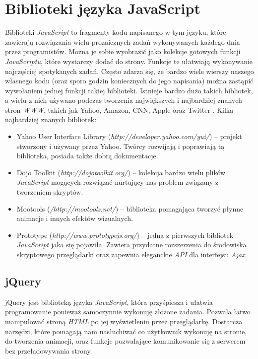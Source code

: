 \documentclass{iiuwb}
\begin{document}
\section{Biblioteki języka JavaScript}
Biblioteki \textit{JavaScript} to fragmenty kodu napisanego w tym języku, które zawierają rozwiązania wielu prozaicznych zadań wykonywanych każdego dnia przez programistów. Można je sobie wyobrazić jako kolekcje gotowych funkcji \textit{JavaScriptu}, które wystarczy dodać do strony. Funkcje te ułatwiają wykonywanie najczęściej spotykanych zadań. Często zdarza się, że bardzo wiele wierszy naszego własnego kodu (oraz sporo godzin koniecznych do jego napisania) można zastąpić wywołaniem jednej funkcji takiej biblioteki. Istnieje bardzo dużo takich bibliotek, a wielu z nich używano podczas tworzenia największych i najbardziej znanych stron \textit{WWW}, takich jak Yahoo, Amazon, CNN, Apple oraz Twitter \cite{McFarland:2012:JS}. Kilka najbardziej znanych bibliotek:
\begin{itemize}
\item Yahoo User Interface Library (\textit{http://developer.yahoo.com/yui/}) -- projekt stworzony i używany przez Yahoo. Twórcy rozwijają i poprawiają tą biblioteka, posiada także dobrą dokumentacje.
\item Dojo Toolkit (\textit{http://dojotoolkit.org/}) -- kolekcja bardzo wielu plików \textit{JavaScript} mogących rozwiązać nurtujący nas problem związany z tworzeniem skryptów.
\item Mootools (\textit{/http://mootools.net/}) -- biblioteka pomagająca tworzyć płynne animacje i innych efektów wizualnych.
\item Prototype (\textit{http://www.prototypejs.org/}) -- jedna z pierwszych bibliotek \textit{JavaScript} jaka się pojawiła. Zawiera przydatne rozszerzenia do środowiska skryptowego przeglądarki oraz zapewnia eleganckie \textit{API} dla interfejsu \textit{Ajax}.
\end{itemize}
\subsection{jQuery}
jQuery jest biblioteką języka \textit{JavaScript}, która przyśpiesza i ułatwia programowanie ponieważ samoczynnie wykonuję złożone zadania. Pozwala łatwo manipulować stroną \textit{HTML}	po jej wyświetleniu przez przeglądarkę. Dostarcza narzędzi, które pomagają nam nasłuchiwać co użytkownik wykonuję na stronie, do tworzenia animacji, oraz funkcje pozwalające komunikowanie się z serwerem bez przeładowywania strony. 
\end{document}
